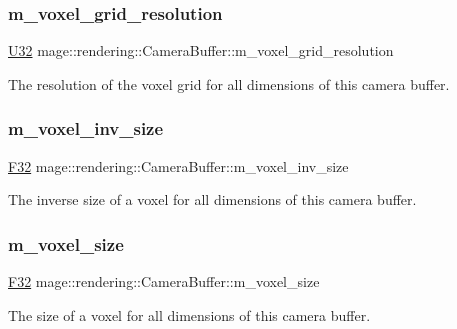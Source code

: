 \subsubsection{\texorpdfstring{m\+\_\+voxel\+\_\+grid\+\_\+resolution}{m\_voxel\_grid\_resolution}}
{\footnotesize\ttfamily \hyperlink{namespacemage_a41c104c036fba3756a74e19f793eeaa1}{U32} mage\+::rendering\+::\+Camera\+Buffer\+::m\+\_\+voxel\+\_\+grid\+\_\+resolution}

The resolution of the voxel grid for all dimensions of this camera buffer. \hypertarget{structmage_1_1rendering_1_1_camera_buffer_a569963eb2b21f83a15c72a2a884be072}{}\label{structmage_1_1rendering_1_1_camera_buffer_a569963eb2b21f83a15c72a2a884be072} 
\subsubsection{\texorpdfstring{m\+\_\+voxel\+\_\+inv\+\_\+size}{m\_voxel\_inv\_size}}
{\footnotesize\ttfamily \hyperlink{namespacemage_aa97e833b45f06d60a0a9c4fc22ae02c0}{F32} mage\+::rendering\+::\+Camera\+Buffer\+::m\+\_\+voxel\+\_\+inv\+\_\+size}

The inverse size of a voxel for all dimensions of this camera buffer. \hypertarget{structmage_1_1rendering_1_1_camera_buffer_a4590424f163a1112682753e94adcf8ae}{}\label{structmage_1_1rendering_1_1_camera_buffer_a4590424f163a1112682753e94adcf8ae} 
\subsubsection{\texorpdfstring{m\+\_\+voxel\+\_\+size}{m\_voxel\_size}}
{\footnotesize\ttfamily \hyperlink{namespacemage_aa97e833b45f06d60a0a9c4fc22ae02c0}{F32} mage\+::rendering\+::\+Camera\+Buffer\+::m\+\_\+voxel\+\_\+size}

The size of a voxel for all dimensions of this camera buffer. \hypertarget{structmage_1_1rendering_1_1_camera_buffer_a1ad39d79411d2d447439daf5bc2ee99b}{}\label{structmage_1_1rendering_1_1_camera_buffer_a1ad39d79411d2d447439daf5bc2ee99b} 
